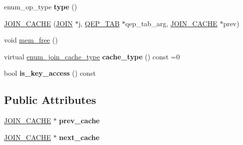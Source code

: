\begin{DoxyCompactItemize}
enum\+\_\+op\+\_\+type {\bfseries type} ()
\item 
\mbox{\hyperlink{classJOIN__CACHE_aa744a4af8aa982a64f2334b141e63026}{J\+O\+I\+N\+\_\+\+C\+A\+C\+HE}} (\mbox{\hyperlink{classJOIN}{J\+O\+IN}} $\ast$j, \mbox{\hyperlink{classQEP__TAB}{Q\+E\+P\+\_\+\+T\+AB}} $\ast$qep\+\_\+tab\+\_\+arg, \mbox{\hyperlink{classJOIN__CACHE}{J\+O\+I\+N\+\_\+\+C\+A\+C\+HE}} $\ast$prev)
\item 
void \mbox{\hyperlink{classJOIN__CACHE_a1607e84802fbf32ca66112ebdd0860b7}{mem\+\_\+free}} ()
\item 
\mbox{\label{classJOIN__CACHE_abaefecd907d3a9cf51fee69144c706f4}} 
virtual \mbox{\hyperlink{classJOIN__CACHE_a74b45254b4573b9531f1b8b536b18e46}{enum\+\_\+join\+\_\+cache\+\_\+type}} {\bfseries cache\+\_\+type} () const =0
\item 
\mbox{\label{classJOIN__CACHE_a1c866097443d5fd6ed5577a656542fa6}} 
bool {\bfseries is\+\_\+key\+\_\+access} () const
\end{DoxyCompactItemize}
\subsection*{Public Attributes}
\begin{DoxyCompactItemize}
\item 
\mbox{\label{classJOIN__CACHE_a5015b4f5a14c83b8515bc64c6f083c1a}} 
\mbox{\hyperlink{classJOIN__CACHE}{J\+O\+I\+N\+\_\+\+C\+A\+C\+HE}} $\ast$ {\bfseries prev\+\_\+cache}
\item 
\mbox{\label{classJOIN__CACHE_a44a7a09a84183455665ab6428018dfb6}} 
\mbox{\hyperlink{classJOIN__CACHE}{J\+O\+I\+N\+\_\+\+C\+A\+C\+HE}} $\ast$ {\bfseries next\+\_\+cache}
\end{DoxyCompactItemize}
